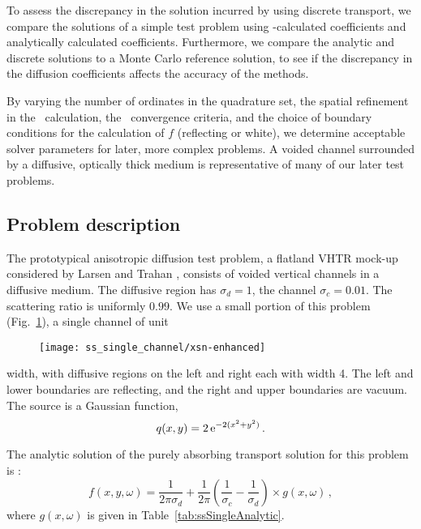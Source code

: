 To assess the discrepancy in the solution incurred by using discrete transport,
we compare the solutions of a simple test problem using \SN-calculated
coefficients and analytically calculated coefficients. Furthermore, we compare
the analytic and discrete solutions to a Monte Carlo reference solution, to see
if the discrepancy in the diffusion coefficients affects the accuracy of
the methods.

By varying the number of ordinates in the quadrature set, the spatial
refinement in the \SN\ calculation, the \SN\ convergence criteria, and the
choice of boundary conditions for the calculation of $f$ (reflecting or white),
we determine acceptable solver parameters for later, more complex
problems.  A
voided channel surrounded by a diffusive, optically thick medium is
representative of many of our later test problems.

\subsection{Problem description}

The prototypical anisotropic diffusion test problem, a flatland VHTR mock-up
considered by Larsen and Trahan \cite{Lar2009c}, consists of voided vertical channels in a
diffusive medium. The diffusive region has $\sigma_d=1$, the channel
$\sigma_c=0.01$. The scattering ratio is uniformly $0.99$.  We use a small
portion of this problem (Fig.~\ref{fig:ssSingleXsn}), a single channel of unit
%
\begin{figure}[htb]
  \centering
  \texttt{[image: ss\_single\_channel/xsn-enhanced]}
  \label{fig:ssSingleXsn}
\end{figure}
%
width, with diffusive regions on the left and right each with width 4. The left
and lower boundaries are reflecting, and the right and upper boundaries are
vacuum. The source is a Gaussian function,
\begin{equation*}
  q(x,y) = 2 \mathop{}\!\mathrm{e}^{-2 (x^2 + y^2)}\,.
\end{equation*}

The analytic solution of the purely absorbing transport solution for this
problem is \cite{Lar2009c}:
\begin{equation}\label{eq:ssSingleAnalytic}
  f(x,y,\omega)
  = \frac{1}{2\pi \sigma_d}
  + \frac{1}{2\pi} \left( \frac{1}{\sigma_c} - \frac{1}{\sigma_d} \right)
  \times g(x,\omega)\,,
\end{equation}
where $g(x,\omega)$ is given in Table~\ref{tab:ssSingleAnalytic}.

